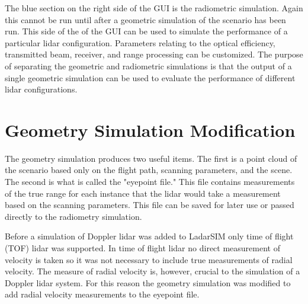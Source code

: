 The blue section on the right side of the GUI is the radiometric simulation. Again this cannot be run
until after a geometric simulation of the scenario has been run. This side of the of the GUI can be used
to simulate the performance of a particular lidar configuration. Parameters relating to the optical efficiency, 
transmitted beam, receiver, and range processing can be customized. The purpose of separating the geometric 
and radiometric simulations is that the output of a single geometric simulation can be used to evaluate the 
performance of different lidar configurations. 

\section{Geometry Simulation Modification}
The geometry simulation produces two useful items. The first is a point cloud of the scenario based only on the
flight path, scanning parameters, and the scene. The second is what is called the "eyepoint file." This file 
contains measurements of the true range for each instance that the lidar would take a measurement based on the
scanning parameters. This file can be saved for later use or passed directly to the radiometry simulation. 

Before a simulation of Doppler lidar was added to LadarSIM only time of flight (TOF) lidar was supported. In time of
flight lidar no direct measurement of velocity is taken so it was not necessary to include true measurements of 
radial velocity. The measure of radial velocity is, however, crucial to the simulation of a Doppler lidar system.
For this reason the geometry simulation was modified to add radial velocity measurements to the eyepoint file. 

